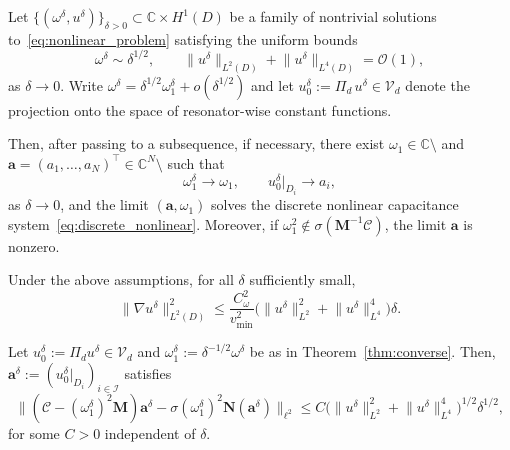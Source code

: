 \documentclass[10pt,a4paper]{amsart}
\begin{document}
\begin{theorem}\label{thm:converse}
    Let $\{(\omega^\delta, u^\delta)\}_{\delta > 0} \subset \mathbb{C} \times H^1(D)$
    be a family of nontrivial solutions to~\eqref{eq:nonlinear_problem}
    satisfying the uniform bounds
    \begin{equation}\label{eq:uniform_bounds}
        \omega^\delta \sim \delta^{1/2},
        \qquad
        \lVert u^\delta \rVert_{L^2(D)}+ \lVert u^\delta \rVert_{L^4(D)} = \mathcal{O}(1),
    \end{equation}
    as $\delta \to 0$. Write $\omega^\delta = \delta^{1/2}\omega_1^\delta + o(\delta^{1/2})$
    and let $u_0^\delta := \Pi_d \, u^\delta \in \mathcal{V}_d$ denote the
    projection onto the space of resonator-wise constant functions.

    Then, after passing to a subsequence, if necessary, there exist
    $\omega_1 \in \mathbb{C} \setminus$ and
    $\mathbf{a} = (a_1, \dots, a_N)^\top \in \mathbb{C}^N \setminus$
    such that
    \begin{equation}
        \omega_1^\delta \to \omega_1,
        \qquad
        u_0^\delta|_{D_i} \to a_i,
    \end{equation}
    as $\delta \to 0$, and the limit $(\mathbf{a}, \omega_1)$ solves the
    discrete nonlinear capacitance
    system~\eqref{eq:discrete_nonlinear}. Moreover, if $\omega_1^2\notin\sigma(\mathbf{M}^{-1}\mathcal{C})$, the limit $\mathbf{a}$ is nonzero.
\end{theorem}

\begin{lemma}\label{lem:gradientbound}
    Under the above assumptions, for all $\delta$ sufficiently small,
    \begin{equation}
        \lVert \nabla u^\delta \rVert_{L^2(D)}^2
        \leq \frac{C_\omega^2}{v_{\min}^2}
        \bigl( \lVert u^\delta \rVert_{L^2}^2
          + \lVert u^\delta \rVert_{L^4}^4 \bigr) \delta.
    \end{equation}
\end{lemma}

\begin{lemma}\label{lem:approximate_discrete}
    Let $u_0^\delta := \Pi_d u^\delta \in \mathcal{V}_d$ and
    $\omega_1^\delta := \delta^{-1/2}\omega^\delta$ be as in
    Theorem~\ref{thm:converse}. Then,
    $\mathbf{a}^\delta := (u_0^\delta|_{D_i})_{i \in \mathcal{I}}$
    satisfies
    \begin{equation}
        \bigl\lVert
          (\mathcal{C} - (\omega_1^\delta)^2 \mathbf{M}) \mathbf{a}^\delta
          - \sigma (\omega_1^\delta)^2 \mathbf{N}(\mathbf{a}^\delta)
        \bigr\rVert_{\ell^2}
        \leq C
        \bigl( \lVert u^\delta \rVert_{L^2}^2
          + \lVert u^\delta \rVert_{L^4}^4 \bigr)^{1/2}
        \delta^{1/2},
    \end{equation}
    for some $C > 0$ independent of $\delta$.
\end{lemma}
\end{document}
